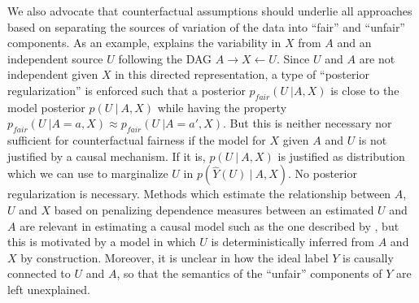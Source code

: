 We also advocate that counterfactual assumptions should underlie all approaches based on separating the sources of variation of the data into ``fair'' and ``unfair'' components. As an example, \citet{louizos2015variational} explains the variability in $X$ from $A$ and an independent source $U$ following the DAG $A \rightarrow X \leftarrow U$. Since $U$ and $A$ are not independent given $X$ in this directed representation, a type of ``posterior regularization'' \citep{ganchev:10} is enforced such that a posterior $p_{fair}(U\ | A, X)$ is close to the model posterior $p(U\ |\ A, X)$ while having the property $p_{fair}(U\ | A = a, X) \approx p_{fair}(U\ | A = a', X)$. But this is neither necessary nor sufficient for counterfactual fairness if the model for $X$ given $A$ and $U$ is not justified by a causal mechanism. If it is, $p(U\ |\ A, X)$ is justified as distribution which we can use to marginalize $U$ in $p(\hat Y(U)\ |\ A, X)$. No posterior regularization is necessary.  Methods which estimate the relationship between $A$, $U$ and $X$ based on penalizing dependence measures between an estimated $U$ and $A$ are relevant in estimating a causal model such as the one described by \citep{mooij:09}, but this is motivated by a model in which $U$ is deterministically inferred from $A$ and $X$ by construction. Moreover, it is unclear in \cite{louizos2015variational} how the ideal label $Y$ is causally connected to $U$ and $A$, so that the semantics of the ``unfair''
components of $Y$ are left unexplained.


